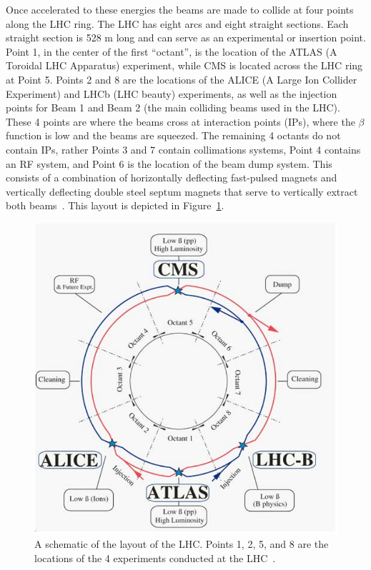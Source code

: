 Once accelerated to these energies the beams are made to collide at four points along the LHC ring.  The LHC has eight arcs and eight straight sections.  Each straight section is 528 m long and can serve as an experimental or insertion point.  Point 1, in the center of the first ``octant'', is the location of the ATLAS (A Toroidal LHC Apparatus) experiment, while CMS is located across the LHC ring at Point 5.  Points 2 and 8 are the locations of the ALICE (A Large Ion Collider Experiment) and LHCb (LHC beauty) experiments, as well as the injection points for Beam 1 and Beam 2 (the main colliding beams used in the LHC).  These 4 points are where the beams cross at interaction points (IPs), where the $\beta$ function is low and the beams are squeezed.  The remaining 4 octants do not contain IPs, rather Points 3 and 7 contain collimations systems, Point 4 contains an RF system, and Point 6 is the location of the beam dump system.  This consists of a combination of horizontally deflecting fast-pulsed magnets and vertically deflecting double steel septum magnets that serve to vertically extract both beams~\cite{LHCmachine}.  This layout is depicted in Figure~\ref{figapp:LHClayout}.



\begin{figure}[!Hh]
       \centering
       \includegraphics[scale=0.5]{Figures/LHClayout.png} 
       \caption[Schematic of the LHC layout.]{A schematic of the layout of the LHC.  Points 1, 2, 5, and 8 are the locations of the 4 experiments conducted at the LHC~\cite{LHCmachine}.}
\label{figapp:LHClayout}
\end{figure}

